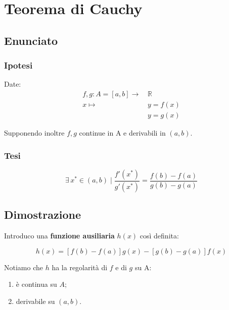 \documentclass[../../dimostrazioni]{subfiles}
\begin{document}
    \chapter{Teorema di Cauchy}
    \label{teoCauchy}

        \section*{Enunciato}

            \subsection*{Ipotesi}

                Date:
                \begin{align*}
                    f,g : A = [a, b] \longrightarrow \, &\mathbb{R}\\
                    x \longmapsto \, &y = f(x)\\
                                  &y = g(x) 
                \end{align*}

                Supponendo inoltre \(f, g\) continue in A e derivabili in \( (a,b) \).

            \subsection*{Tesi}

                \[ 
                    \exists \, x^* \in (a,b) \mid \frac{ f'(x^*) }{ g'(x^*) } = \frac{ f(b) - f(a) }{ g(b) - g(a) }
                \]

        \section*{Dimostrazione}

            Introduco una \textbf{funzione ausiliaria} \(h(x)\) così definita:

            \[ 
                h(x) = \left[f(b) - f(a)\right]g(x) - \left[g(b) - g(a)\right]f(x)
            \]

            Notiamo che \(h\) ha la regolarità di \(f\) e di \(g\) su A:
            \begin{enumerate}
                \indentitem \item è continua su \( A \);
                \indentitem \item derivabile su \( (a, b) \).
            \end{enumerate}
\end{document}
